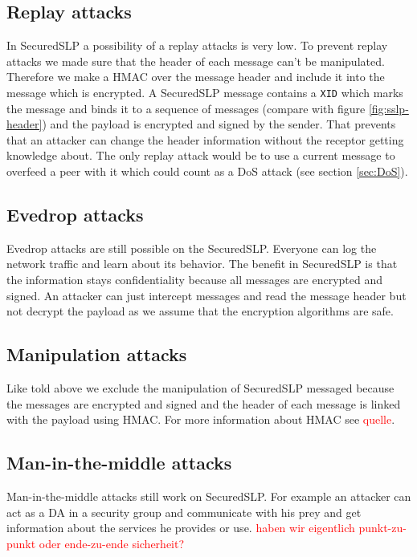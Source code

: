 \subsection{Replay attacks}
In SecuredSLP a possibility of a replay attacks is very low. To prevent replay attacks we made sure that the header of each message can't be manipulated. Therefore we make a HMAC over the message header and include it into the message which is encrypted.  A SecuredSLP message contains a \texttt{XID} which marks the message and binds it to a sequence of messages (compare with figure \ref{fig:sslp-header}) and the payload is encrypted and signed by the sender. That prevents that an attacker can change the header information without the receptor getting knowledge about. The only replay attack would be to use a current message to overfeed a peer with it which could count as a DoS attack (see section \ref{sec:DoS}).

\subsection{Evedrop attacks}
Evedrop attacks are still possible on the SecuredSLP. Everyone can log the network traffic and learn about its behavior. The benefit in SecuredSLP is that the information stays confidentiality because all messages are encrypted and signed. An attacker can just intercept messages and read the message header but not decrypt the payload as we assume that the encryption algorithms are safe.

\subsection{Manipulation attacks}
Like told above we exclude the manipulation of SecuredSLP messaged because the messages are encrypted and signed and the header of each message is linked with the payload using HMAC. For more information about HMAC see \textcolor{red}{quelle}.

\subsection{Man-in-the-middle attacks}
Man-in-the-middle attacks still work on SecuredSLP. For example an attacker can act as a DA in a security group and communicate with his prey and get information about the services he provides or use. \textcolor{red}{haben wir eigentlich punkt-zu-punkt oder ende-zu-ende sicherheit?}